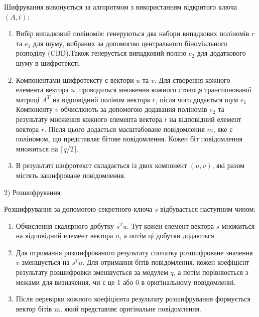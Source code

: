 Шифрування виконується за алгоритмом з використанням відкритого ключа $(A, t)$:
\begin{enumerate}[label=\alph*)]
    \item Вибір випадковий поліномів: генеруються два набори випадкових поліномів $r$ та $e_1$ для шуму, вибраних за допомогою центрального біноміального розподілу (CBD).Також генерується випадковий поліно $e_2$ для додаткового шуму в шифротексті. 

    \item Компонентами шифротексту є вектори $u$ та $v$. Для створення кожного елемента вектора $u$, проводиться множення кожного стовпця транспонованої матриці $A^T$ на відповідний поліном вектора $r$,  після чого додається шум $e_1$
    Компоненту $v$ обчислюють за допомогою додавання поліномів $e_2$ та результату множення кожного елемента вектора $t$ на відповідний елемент вектора $r$. Після цього додається масштабоване повідомлення $m$, яке є поліномом, що представляє бітове повідомлення. Кожен біт повідомлення множиться на $\lceil q/2 \rceil$.

    \item В результаті шифротекст складається із двох компонент $(u, v)$, які разом містять зашифроване повідомлення. 
\end{enumerate}

2) Розшифрування

Розшифрування за допомогою секретного ключа $s$ відбувається наступним чином:
\begin{enumerate}[label=\alph*)]
    \item Обчислення скалярного добутку $s^Tu$. Тут кожен елемент вектора $s$ множиться на відповідний елемент вектора $u$, а потім ці добутки додаються.

    \item Для отримання розшифрованого результату спочатку розшифроване значення $v$ зменшується на $s^Tu$. Для отримання бітів повідомлення, кожен коефіцієнт результату розшифровки зменшується за модулем $q$, а потім порівнюється з межами для визначення, чи є це 1 або 0 в оригінальному повідомленні. 

    \item Після перевірки кожного коефіцієнта результату розшифрування формується вектор бітів m, який представляє оригінальне повідомлення.
\end{enumerate}



